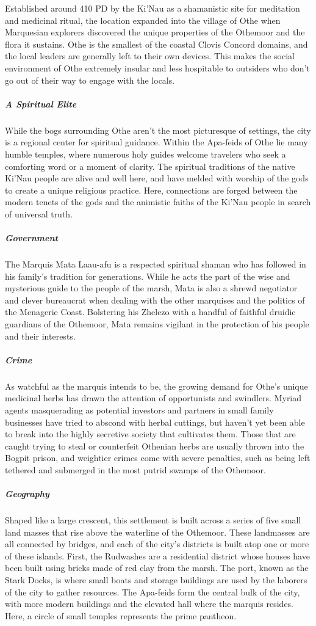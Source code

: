 \documentclass[10pt,a4paper,twoside,bg=print,twocolumn,openany,nodeprecatedcode]{dndbook}
\begin{document}
Established around 410 PD by the Ki'Nau as a shamanistic site for meditation and medicinal ritual, the location expanded into the village of Othe when Marquesian explorers discovered the unique properties of the Othemoor and the flora it sustains. Othe is the smallest of the coastal Clovis Concord domains, and the local leaders are generally left to their own devices. This makes the social environment of Othe extremely insular and less hospitable to outsiders who don't go out of their way to engage with the locals.

\subparagraph{A Spiritual Elite}
While the bogs surrounding Othe aren't the most picturesque of settings, the city is a regional center for spiritual guidance. Within the Apa-feids of Othe lie many humble temples, where numerous holy guides welcome travelers who seek a comforting word or a moment of clarity. The spiritual traditions of the native Ki'Nau people are alive and well here, and have melded with worship of the gods to create a unique religious practice. Here, connections are forged between the modern tenets of the gods and the animistic faiths of the Ki'Nau people in search of universal truth.

\subparagraph{Government}
The Marquis Mata Laau-afu is a respected spiritual shaman who has followed in his family's tradition for generations. While he acts the part of the wise and mysterious guide to the people of the marsh, Mata is also a shrewd negotiator and clever bureaucrat when dealing with the other marquises and the politics of the Menagerie Coast. Bolstering his Zhelezo with a handful of faithful druidic guardians of the Othemoor, Mata remains vigilant in the protection of his people and their interests.

\subparagraph{Crime}
As watchful as the marquis intends to be, the growing demand for Othe's unique medicinal herbs has drawn the attention of opportunists and swindlers. Myriad agents masquerading as potential investors and partners in small family businesses have tried to abscond with herbal cuttings, but haven't yet been able to break into the highly secretive society that cultivates them. Those that are caught trying to steal or counterfeit Othenian herbs are usually thrown into the Bogpit prison, and weightier crimes come with severe penalties, such as being left tethered and submerged in the most putrid swamps of the Othemoor.

\subparagraph{Geography}
Shaped like a large crescent, this settlement is built across a series of five small land masses that rise above the waterline of the Othemoor. These landmasses are all connected by bridges, and each of the city's districts is built atop one or more of these islands. First, the Rudwashes are a residential district whose houses have been built using bricks made of red clay from the marsh. The port, known as the Stark Docks, is where small boats and storage buildings are used by the laborers of the city to gather resources. The Apa-feids form the central bulk of the city, with more modern buildings and the elevated hall where the marquis resides. Here, a circle of small temples represents the prime pantheon.
\end{document}
